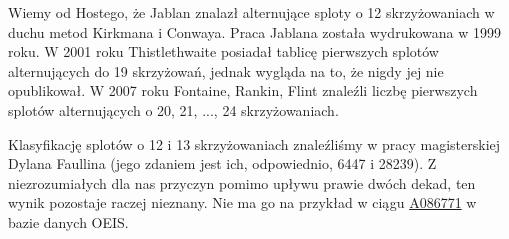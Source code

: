 Wiemy od Hostego, że Jablan \cite{jablan1999} znalazł alternujące sploty o 12 skrzyżowaniach w duchu metod Kirkmana i Conwaya.
%
Praca Jablana została wydrukowana w 1999 roku.
W 2001 roku Thistlethwaite posiadał tablicę pierwszych splotów alternujących do 19 skrzyżowań, jednak wygląda na to, że nigdy jej nie opublikował.
%
W 2007 roku Fontaine, Rankin, Flint znaleźli liczbę pierwszych splotów alternujących o 20, 21, ..., 24 skrzyżowaniach.
%
%
%

Klasyfikację splotów o 12 i 13 skrzyżowaniach znaleźliśmy w pracy magisterskiej Dylana Faullina (jego zdaniem jest ich, odpowiednio, 6447 i 28239).
%
Z niezrozumiałych dla nas przyczyn pomimo upływu prawie dwóch dekad, ten wynik pozostaje raczej nieznany.
Nie ma go na przykład w ciągu \href{https://oeis.org/A086771}{A086771} w bazie danych OEIS.

